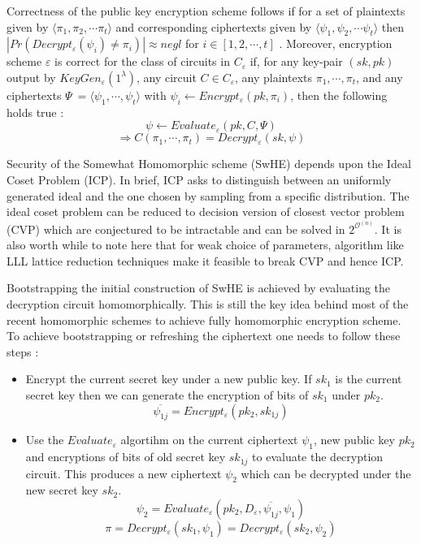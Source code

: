 \documentclass[10pt,journal,compsoc]{IEEEtran}
\theoremstyle{definition}
\begin{document}
Correctness of the public key encryption scheme follows if for a set of plaintexts given by $\langle \pi_1, \pi_2, \cdots \pi_t \rangle$ and corresponding ciphertexts given by $\langle \psi_1, \psi_2, \cdots \psi_t \rangle$ then $|Pr\left(Decrypt_\varepsilon\left(\psi_i\right)\neq \pi_i\right)| \approx negl$ for $i \in \left[1,2,\cdots,t\right]$ . Moreover, encryption scheme $\varepsilon$ is correct for the class of circuits in $C_\varepsilon$ if, for any key-pair $(sk, pk)$ output by $KeyGen_\varepsilon\left(1^\lambda\right)$, any circuit $C \in C_\varepsilon$, any plaintexts $\pi_1,\cdots,\pi_t$, and any ciphertexts $\Psi \ = \langle \psi_1,\cdots,\psi_t\rangle$ with $\psi_i \leftarrow Encrypt_\varepsilon\left(pk,\pi_i\right)$, then the following holds true :
$$\psi \leftarrow Evaluate_\varepsilon\left(pk,C,\Psi\right)$$ 
$$\Rightarrow C\left(\pi_1,\cdots,\pi_t\right) = Decrypt_\varepsilon\left(sk,\psi\right)$$ 

Security of the Somewhat Homomorphic scheme (SwHE) depends upon the Ideal Coset Problem (ICP). In brief, ICP asks to distinguish between an uniformly generated ideal and the one chosen by sampling from a specific distribution. The ideal coset problem can be reduced to decision version of closest vector problem (CVP) which are conjectured to be intractable and can be solved in $2^{\mathcal{O}^{(n)}}$. It is also worth while to note here that for weak choice of parameters, algorithm like LLL lattice reduction techniques make it feasible to break CVP and hence ICP.

Bootstrapping the initial construction of SwHE is achieved by evaluating the decryption circuit homomorphically. This is still the key idea behind most of the recent homomorphic schemes to achieve fully homomorphic encryption scheme. To achieve bootstrapping or refreshing the ciphertext one needs to follow these steps :

\begin{itemize}
\item Encrypt the current secret key under a new public key. If $sk_1$ is the current secret key then we can generate the encryption of bits of $sk_1$ under $pk_2$.
$$\overline{\psi_{1j}} = Encrypt_\varepsilon\left( pk_2,sk_{1j}\right)$$

\item Use the $Evaluate_\varepsilon$ algortihm on the current ciphertext $\psi_1$, new public key $pk_2$ and encryptions of bits of old secret key $sk_{1j}$ to evaluate the decryption circuit. This produces a new ciphertext $\psi_2$ which can be decrypted under the new secret key $sk_2$.
$$\psi_2 = Evaluate_\varepsilon\left(pk_2, D_\varepsilon, \overline{\psi_{1j}}, \psi_1 \right)$$ 
$$ \pi = Decrypt_\varepsilon\left(sk_1,\psi_1 \right) = Decrypt_\varepsilon\left(sk_2,\psi_2 \right)$$
\end{itemize} 
\end{document}
